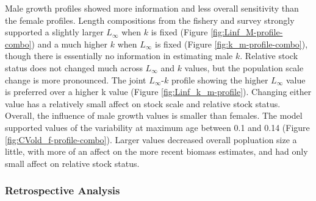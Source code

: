 \documentclass[11pt,
  english,
  a4paper,
]{article}
\begin{document}
Male growth profiles showed more information and less overall sensitivity than the female profiles. Length compositions from the fishery and survey strongly supported a slightly larger {\(L_{\infty}\)\leavevmode\tagmcend\tagstructend} when {\(k\)\leavevmode\tagmcend\tagstructend} is fixed (Figure \ref{fig:Linf_M-profile-combo}) and a much higher {\(k\)\leavevmode\tagmcend\tagstructend} when {\(L_{\infty}\)\leavevmode\tagmcend\tagstructend} is fixed (Figure \ref{fig:k_m-profile-combo}), though there is essentially no information in estimating male {\(k\)\leavevmode\tagmcend\tagstructend}. Relative stock status does not changed much across {\(L_{\infty}\)\leavevmode\tagmcend\tagstructend} and {\(k\)\leavevmode\tagmcend\tagstructend} values, but the population scale change is more pronounced. The joint {\(L_{\infty}\)\leavevmode\tagmcend\tagstructend}-{\(k\)\leavevmode\tagmcend\tagstructend} profile showing the higher {\(L_{\infty}\)\leavevmode\tagmcend\tagstructend} value is preferred over a higher k value (Figure \ref{fig:Linf_k_m-profile}). Changing either value has a relatively small affect on stock scale and relative stock status. Overall, the influence of male growth values is smaller than females. The model supported values of the variability at maximum age between 0.1 and 0.14 (Figure \ref{fig:CVold_f-profile-combo}). Larger values decreased overall popluation size a little, with more of an affect on the more recent biomass estimates, and had only small affect on relative stock status.

\leavevmode\tagmcend\tagstructend\par


\hypertarget{retrospective-analysis}{%
\subsubsection{Retrospective Analysis}\label{retrospective-analysis}}

\leavevmode\tagmcend\tagstructend
\end{document}
